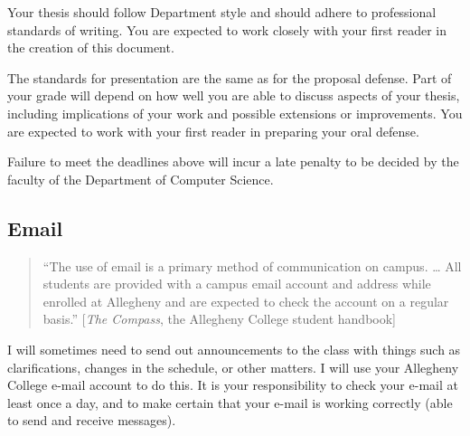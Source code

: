 Your thesis should follow Department style and should adhere to
professional standards of writing. You are expected to work closely with
your first reader in the creation of this document.

\medskip 
{}
The standards for presentation are the same as for the proposal defense.
Part of your grade will depend on how well you are able to discuss
aspects of your thesis, including 
implications of your work and possible extensions or improvements.
You are expected to work with your first reader in preparing your
oral defense.

Failure to meet the deadlines above will incur a late penalty to be decided by
the faculty of the Department of Computer Science.


\subsection*{Email}
\begin{quote}
``The use of email is a primary method of communication on campus. \ldots
All students are provided with a campus email account and address while
enrolled at Allegheny and are expected to check the account on a regular
basis.'' [{\em The Compass}, the Allegheny College student handbook]
\end{quote}
I will sometimes need to send out announcements to the class with
things such as clarifications, changes in the
schedule, or other matters. I will use your Allegheny College e-mail account
to do this. It is your responsibility to check your e-mail at least once a
day, and to make certain that your e-mail is working correctly (able to send
and receive messages).

